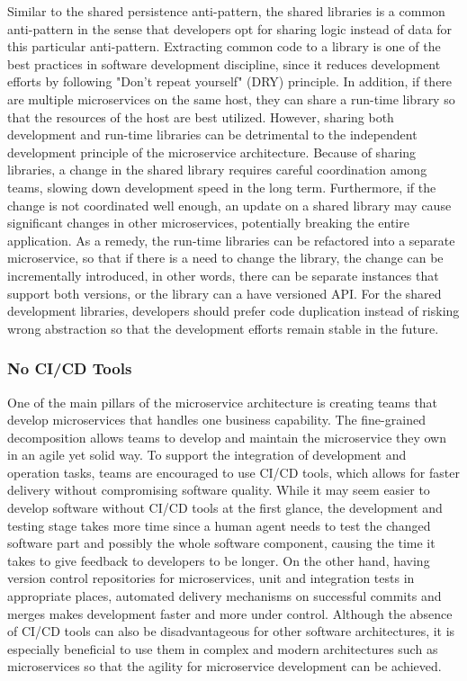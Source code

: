 \documentclass{Configuration_Files/PoliMi3i_thesis}
\begin{document}
Similar to the shared persistence anti-pattern, the shared libraries is a common anti-pattern in the sense that developers opt for sharing logic instead of data for this particular anti-pattern.
Extracting common code to a library is one of the best practices in software development discipline, since it reduces development efforts by following "Don't repeat yourself" (DRY) principle.
In addition, if there are multiple microservices on the same host, they can share a run-time library so that the resources of the host are best utilized.
However, sharing both development and run-time libraries can be detrimental to the independent development principle of the microservice architecture.
Because of sharing libraries, a change in the shared library requires careful coordination among teams, slowing down development speed in the long term. Furthermore, if the change is not coordinated well enough, an update on a shared library may cause significant changes in other microservices, potentially breaking the entire application.
As a remedy, the run-time libraries can be refactored into a separate microservice, so that if there is a need to change the library, the change can be incrementally introduced, in other words, there can be separate instances that support both versions, or the library can a have versioned API.
For the shared development libraries, developers should prefer code duplication instead of risking wrong abstraction so that the development efforts remain stable in the future.

\subsubsection{No CI/CD Tools}
\label{subsubsec:no_cicd}

One of the main pillars of the microservice architecture is creating teams that develop microservices that handles one business capability.
The fine-grained decomposition allows teams to develop and maintain the microservice they own in an agile yet solid way.
To support the integration of development and operation tasks, teams are encouraged to use CI/CD tools, which allows for faster delivery without compromising software quality.
While it may seem easier to develop software without CI/CD tools at the first glance, the development and testing stage takes more time since a human agent needs to test the changed software part and possibly the whole software component, causing the time it takes to give feedback to developers to be longer.
On the other hand, having version control repositories for microservices, unit and integration tests in appropriate places, automated delivery mechanisms on successful commits and merges makes development faster and more under control.
Although the absence of CI/CD tools can also be disadvantageous for other software architectures, it is especially beneficial to use them in complex and modern architectures such as microservices so that the agility for microservice development can be achieved.
\end{document}
